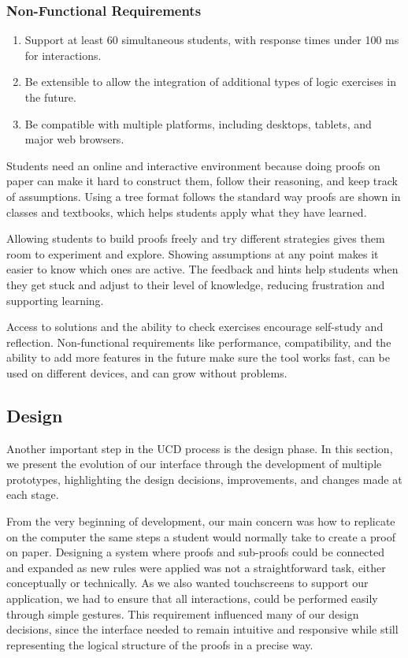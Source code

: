 \subsubsection*{Non-Functional Requirements}
\begin{enumerate}
    \item Support at least 60 simultaneous students, with response times under 100 ms for interactions.
    \item Be extensible to allow the integration of additional types of logic exercises in the future.
    \item Be compatible with multiple platforms, including desktops, tablets, and major web browsers.
\end{enumerate}

Students need an online and interactive environment because doing proofs on paper can make it hard to construct them, follow their reasoning, and keep track of assumptions. Using a tree format follows the standard way proofs are shown in classes and textbooks, which helps students apply what they have learned.

Allowing students to build proofs freely and try different strategies gives them room to experiment and explore. Showing assumptions at any point makes it easier to know which ones are active. The feedback and hints help students when they get stuck and adjust to their level of knowledge, reducing frustration and supporting learning.

Access to solutions and the ability to check exercises encourage self-study and reflection. Non-functional requirements like performance, compatibility, and the ability to add more features in the future make sure the tool works fast, can be used on different devices, and can grow without problems.

\subsection{Design}
Another important step in the \gls{UCD} process is the design phase. In this section, we present the evolution of our interface through the development of multiple prototypes, highlighting the design decisions, improvements, and changes made at each stage.

From the very beginning of development, our main concern was how to replicate on the computer the same steps a student would normally take to create a proof on paper. Designing a system where proofs and sub-proofs could be connected and expanded as new rules were applied was not a straightforward task, either conceptually or technically. As we also wanted touchscreens to support our application, we had to ensure that all interactions, could be performed easily through simple gestures. This requirement influenced many of our design decisions, since the interface needed to remain intuitive and responsive while still representing the logical structure of the proofs in a precise way.

